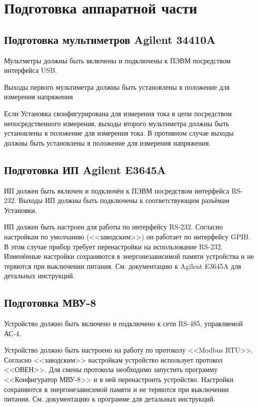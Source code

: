 \documentclass[12pt, a4paper, twocolumn]{book}
\begin{document}
\section{Подготовка аппаратной части}

\subsection{Подготовка мультиметров Agilent 34410A}

Мультметры должны быть включены и подключены к ПЭВМ посредством интерфейса USB.

Выходы первого мультиметра должны быть установлены в положение для измерения напряжения

Если Установка сконфигурирована для измерения тока в цепи посредством непосредственного измерения, выходы второго мультиметра должны быть установлены в положение для измерения тока. В противном случае выходы должны быть установлены в положение для измерения напряжения.

\subsection{Подготовка ИП Agilent E3645A}

ИП должен быть включен и подключён к ПЭВМ посредством интерфейса RS-232. Выходы ИП должны быть подключены к соответствующим разъёмам Установки.

ИП должен быть настроен для работы по интерфейсу RS-232. Согласно настройкам по умолчанию (<<заводским>>) он работает по интерфейсу GPIB. В этом случае прибор требует перенастройки на использование RS-232. Изменённые настройки сохраняются в энергонезависимой памяти устройства и не теряются при выключении питания. См. документацию к Agilent E3645A для детальных инструкций.

\subsection{Подготовка МВУ-8}

Устройство должно быть включено и подключено к сети RS-485, управляемой АС-4.

Устройство должно быть настроено на работу по протоколу <<Modbus RTU>>. Согласно <<заводским>> настройкам устройство использует протокол <<ОВЕН>>. Для смены протокола необходимо запустить программу <<Конфигуратор МВУ-8>> и в ней перенастроить устройство. Настройки сохраняются в энергонезависимой памяти и не теряются при выключении питания. См. документацию к программе для детальных инструкций.
\end{document}
